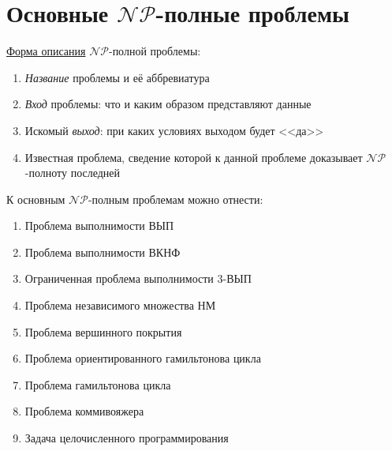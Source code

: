 \section{Основные $\mathscr{NP}$-полные проблемы}
\underline{Форма описания} $\mathscr{NP}$-полной проблемы:

\begin{enumerate}
    \item \textit{Название} проблемы и её аббревиатура
    \item \textit{Вход} проблемы: что и каким образом представляют данные
    \item Искомый \textit{выход}: при каких условиях выходом будет <<да>>
    \item Известная проблема, сведение которой к данной проблеме доказывает $\mathscr{NP}$-полноту последней
\end{enumerate}

К основным $\mathscr{NP}$-полным проблемам можно отнести:
\begin{enumerate}
    \item Проблема выполнимости ВЫП
    \item Проблема выполнимости ВКНФ
    \item Ограниченная проблема выполнимости 3-ВЫП
    \item Проблема независимого множества НМ
    \item Проблема вершинного покрытия
    \item Проблема ориентированного гамильтонова цикла
    \item Проблема гамильтонова цикла
    \item Проблема коммивояжера
    \item Задача целочисленного программирования
\end{enumerate}